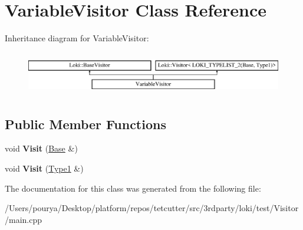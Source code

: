 \hypertarget{classVariableVisitor}{}\section{Variable\+Visitor Class Reference}
\label{classVariableVisitor}
Inheritance diagram for Variable\+Visitor\+:\begin{figure}[H]
\begin{center}
\leavevmode
\includegraphics[height=1.931034cm]{classVariableVisitor}
\end{center}
\end{figure}
\subsection*{Public Member Functions}
\begin{DoxyCompactItemize}
\item 
\hypertarget{classVariableVisitor_ae44f2a9af2d3ee6031f26e4935e4d84f}{}void {\bfseries Visit} (\hyperlink{structBase}{Base} \&)\label{classVariableVisitor_ae44f2a9af2d3ee6031f26e4935e4d84f}

\item 
\hypertarget{classVariableVisitor_a50124ba8ad336c19701d00882a3089ce}{}void {\bfseries Visit} (\hyperlink{classType1}{Type1} \&)\label{classVariableVisitor_a50124ba8ad336c19701d00882a3089ce}

\end{DoxyCompactItemize}


The documentation for this class was generated from the following file\+:\begin{DoxyCompactItemize}
\item 
/\+Users/pourya/\+Desktop/platform/repos/tetcutter/src/3rdparty/loki/test/\+Visitor/main.\+cpp\end{DoxyCompactItemize}
